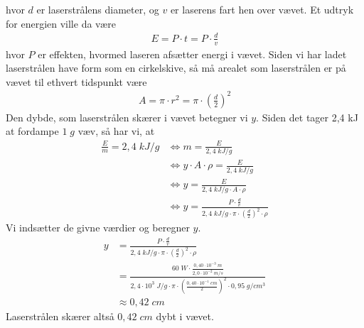 \documentclass{report}
\begin{document}
hvor $d$ er laserstrålens diameter, og $v$ er laserens fart hen over vævet. 
Et udtryk for energien ville da være
\begin{equation*}
\begin{split}
E=P \cdot t = P \cdot \frac{d}{v}
\end{split}
\end{equation*}
hvor $P$ er effekten, hvormed laseren afsætter energi i vævet. 
Siden vi har ladet laserstrålen have form som en cirkelskive, så må arealet som laserstrålen er på vævet til ethvert tidspunkt være
\begin{equation*}
\begin{split}
A= \pi \cdot r^2 = \pi \cdot \left(\frac{d}{2}\right)^2
\end{split}
\end{equation*}
Den dybde, som laserstrålen skærer i vævet betegner vi $y$.
Siden det tager 2,4 kJ at fordampe $1 \;\unit{g} $ væv, så har vi, at 
\begin{equation*}
\begin{split}
\frac{E}{m}=2,4 \;\unit{kJ/g} &\iff m=\frac{E}{2,4 \;\unit{kJ/g} }\\
&\iff y \cdot A \cdot \rho = \frac{E}{2,4 \;\unit{kJ/g} }\\
&\iff y=\frac{E}{2,4 \;\unit{kJ/g} \cdot A \cdot \rho }\\
&\iff y=\frac{P \cdot \frac{d}{v}}{2,4 \;\unit{kJ/g} \cdot \pi \cdot \left(\frac{d}{2}\right)^2 \cdot \rho }
\end{split}
\end{equation*}
Vi indsætter de givne værdier og beregner $y$.
\begin{equation*}
\begin{split}
y&=\frac{P \cdot \frac{d}{v}}{2,4 \;\unit{kJ/g} \cdot \pi \cdot \left(\frac{d}{2}\right)^2 \cdot \rho }\\
&=\frac{60 \;\unit{W} \cdot \frac{0,40 \cdot 10 ^{-3} \;\unit{m} }{2,0 \cdot 10 ^{-2} \;\unit{m/s} }}{2,4 \cdot 10^3 \;\unit{J/g} \cdot \pi \cdot \left(\frac{0,40 \cdot 10 ^{-1} \;\unit{cm} }{2}\right)^2 \cdot 0,95 \;\unit{g/cm^3} }\\
&\approx 0,42 \;\unit{cm} 
\end{split}
\end{equation*}
Laserstrålen skærer altså $0,42 \;\unit{cm} $ dybt i vævet. 
\end{document}
